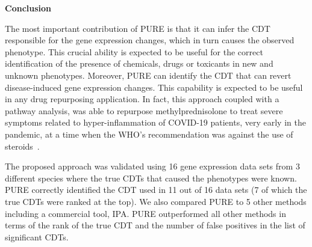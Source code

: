 \documentclass[Minh_PhD_thesis.tex]{subfiles}
\begin{document}
\textbf{Conclusion}

The most important contribution of PURE is that it can infer the CDT responsible for the gene expression changes, which in turn causes the observed phenotype. This crucial ability is expected to be useful for the correct identification of the presence of chemicals, drugs or toxicants in new and unknown phenotypes.  Moreover, PURE can identify the CDT that can revert disease-induced gene expression changes. This capability is expected to be useful in any drug repurposing application. In fact, this approach coupled with a pathway analysis, was able to repurpose methylprednisolone to treat severe symptoms related to hyper-inflammation of COVID-19 patients, very early in the pandemic, at a time when the WHO's recommendation was against the use of steroids~\cite{DraghiciCOVID:2021}.
 
The proposed approach was validated using 16 gene expression data sets from 3 different species where the true CDTs that caused the phenotypes were known. PURE correctly identified the CDT used in 11 out of 16 data sets (7 of which the true CDTs were ranked at the top). We also compared PURE to 5 other methods including a commercial tool, IPA. PURE outperformed all other methods in terms of the rank of the true CDT and the number of false positives in the list of significant CDTs.
\end{document}
